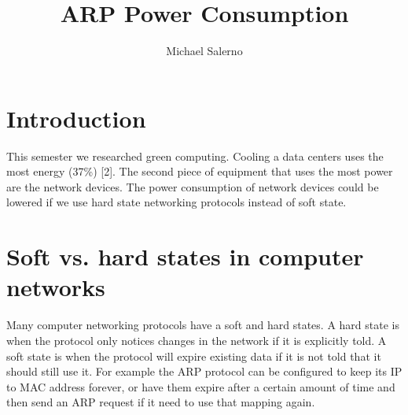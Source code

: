 \documentclass{article}
\title{ARP Power Consumption}
\author{Michael Salerno}
\begin{document}
\pagestyle{empty}

\maketitle

\def\normalbaselines{\baselineskip20pt \lineskip3pt \lineskiplimit3pt}

\def\mapright{\smash{\mathop{\longrightarrow}}}
\def\mapincl{\smash{\mathop{\hookrightarrow}}}
\def\mapup{\Big\uparrow}
\def\mapdown{\Big\downarrow}
\def\mapdowneq{\Big\parallel}

\def\Mapright#1{\smash{\mathop{\longrightarrow}\limits^{#1}}}
\def\Mapincl#1{\smash{\mathop{\hookrightarrow}\limits^{#1}}}
\def\Mapup#1{\Big\uparrow\rlap{$\vcenter{\hbox{$\scriptstyle#1$}}$}}
\def\Mapdown#1{\Big\downarrow\rlap{$\vcenter{\hbox{$\scriptstyle#1$}}$}}
\def\Mapdowneq#1{\Big\parallel\rlap{$\vcenter{\hbox{$\scriptstyle#1$}}$}}

\newcommand{\vsp}{\vspace{1pc}}
\newcommand{\disp}{\displaystyle}

\newcommand{\X}{{\cal X}}
\newcommand{\Y}{{\cal Y}}
\newcommand{\Z}{{\cal Z}}

\def\pitch{\mathbin{\frown \! \! \! \! \mid \, \, \,}}


\section{Introduction}

This semester we researched green computing. Cooling a data centers uses the most energy (37\%) [2]. The second piece of equipment that uses the most power are the network devices. The power consumption of network devices could be lowered if we use hard state networking protocols instead of soft state.

\section{Soft vs. hard states in computer networks}

Many computer networking protocols have a soft and hard states. A hard state is when the protocol only notices changes in the network if it is explicitly told. A soft state is when the protocol will expire existing data if it is not told that it should still use it. For example the ARP protocol can be configured to keep its IP to MAC address forever, or have them expire after a certain amount of time and then send an ARP request if it need to use that mapping again.
\end{document}
